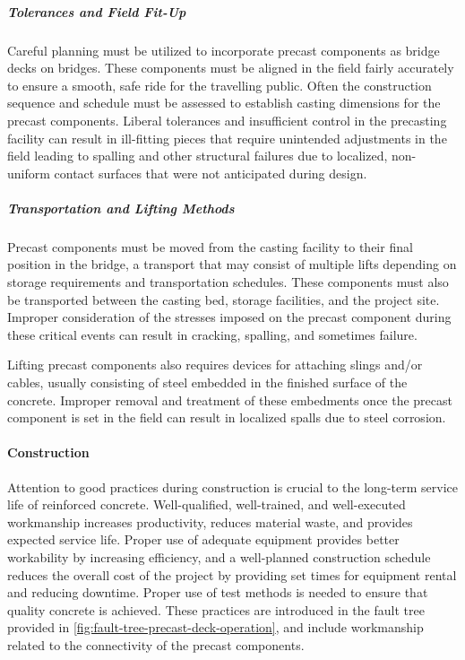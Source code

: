 \subparagraph{Tolerances and Field Fit-Up}
Careful planning must be utilized to incorporate precast components as bridge decks on bridges. These components must be aligned in the field fairly accurately to ensure a smooth, safe ride for the travelling public. Often the construction sequence and schedule must be assessed to establish casting dimensions for the precast components. Liberal tolerances and insufficient control in the precasting facility can result in ill-fitting pieces that require unintended adjustments in the field leading to spalling and other structural failures due to localized, non-uniform contact surfaces that were not anticipated during design.

\subparagraph{Transportation and Lifting Methods}
Precast components must be moved from the casting facility to their final position in the bridge, a transport that may consist of multiple lifts depending on storage requirements and transportation schedules. These components must also be transported between the casting bed, storage facilities, and the project site. Improper consideration of the stresses imposed on the precast component during these critical events can result in cracking, spalling, and sometimes failure.

Lifting precast components also requires devices for attaching slings and/or cables, usually consisting of steel
embedded in the finished surface of the concrete. Improper removal and treatment of these embedments once the
precast component is set in the field can result in localized spalls due to steel corrosion.

\paragraph{Construction}
Attention to good practices during construction is crucial to the long-term service life of reinforced concrete. Well-qualified, well-trained, and well-executed workmanship increases productivity, reduces material waste, and provides expected service life. Proper use of adequate equipment provides better workability by increasing efficiency, and a well-planned construction schedule reduces the overall cost of the project by providing set times for equipment rental and reducing downtime. Proper use of test methods is needed to ensure that quality concrete is achieved. These practices are introduced in the fault tree provided in \cref{fig:fault-tree-precast-deck-operation}, and include workmanship related to the connectivity of the precast components.


